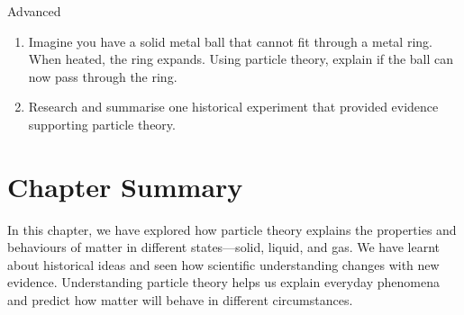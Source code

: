 \begin{tieredquestions}{Advanced}
\begin{enumerate}
    \item Imagine you have a solid metal ball that cannot fit through a metal ring. When heated, the ring expands. Using particle theory, explain if the ball can now pass through the ring.
    \item Research and summarise one historical experiment that provided evidence supporting particle theory.
\end{enumerate}
\end{tieredquestions}

\section{Chapter Summary}

In this chapter, we have explored how particle theory explains the properties and behaviours of matter in different states—solid, liquid, and gas. We have learnt about historical ideas and seen how scientific understanding changes with new evidence. Understanding particle theory helps us explain everyday phenomena and predict how matter will behave in different circumstances.